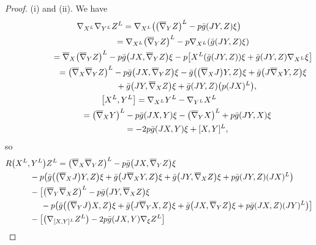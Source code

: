 \documentclass[10pt,a4paper]{amsart}
\numberwithin{equation}{section}
\theoremstyle{definition}
\newcommand{\bbn}{\overline{\nabla}}
\newcommand{\bgg}{\bar g}
\begin{document}
\begin{proof} (i) and (ii).
We have
\begin{gather*}\nabla_{X^{L}} \nabla_{Y^{L}} Z^{L}
 = \nabla_{X^{L}} \bigl( \bigl(\bbn_{Y} Z\bigr)^{L} - p \bgg (J Y, Z) \xi\bigr)\nonumber\\
 \hphantom{\nabla_{X^{L}} \nabla_{Y^{L}} Z^{L}}{}
 = \nabla_{X^{L}} \bigl(\bbn_{Y} Z\bigr)^{L} - p \nabla_{X^{L}} (\bgg (J Y, Z) \xi)\nonumber\\
 \hphantom{\nabla_{X^{L}} \nabla_{Y^{L}} Z^{L}}{}
 = \bbn_{X}\bigl(\bbn_{Y} Z\bigr)^{L} - p \bgg \bigl(J X, \bbn_{Y} Z \bigr) \xi - p \bigl[ X^{L} (\bgg(J Y, Z)) \xi + \bgg(J Y, Z) \nabla_{X^ L} \xi \bigr]\nonumber\\
 \hphantom{\nabla_{X^{L}} \nabla_{Y^{L}} Z^{L}}{}
 =\bigl(\bbn_{X} \bbn_{Y} Z\bigr)^{L} - p \bgg\bigl(J X, \bbn_{Y} Z\bigr) \xi
 - \bgg\bigl(\bigl(\bbn_{X} J\bigr) Y, Z\bigr) \xi + \bgg\bigl(J \bbn_{X} Y, Z\bigr) \xi \nonumber\\
 \hphantom{\nabla_{X^{L}} \nabla_{Y^{L}} Z^{L}=}{}
 + \bgg \bigl(J Y, \bbn_{X} Z\bigr) \xi + \bgg (JY, Z) \bigl(p (J X)^{L}\bigr),\nonumber\\
\bigl[X^{L}, Y^{L}\bigr]
 = \nabla_{X^ L} Y^{L} - \nabla_{Y^ L} X^{L} \nonumber\\
 \hphantom{\bigl[X^{L}, Y^{L}\bigr]}{}
 = \bigl(\bbn_{X} Y\bigr)^{L} - p \bgg(J X, Y) \xi - \bigl(\bbn_{Y} X\bigr)^{L} + p \bgg(J Y, X) \xi \nonumber\\
 \hphantom{\bigl[X^{L}, Y^{L}\bigr]}{}
 = -2 p \bgg(J X, Y) \xi + [X, Y]^{L}, \nonumber
\end{gather*}
so
\begin{align*}&R\bigl(X^{L}, Y^{L}\bigr) Z^{L}
 = \bigl(\bbn_{X} \bbn_{Y} Z\bigr)^{L} - p \bgg\bigl(J X, \bbn_{Y} Z\bigr) \xi \nonumber\\
 &\qquad\quad{} - p \bigl(\bgg\bigl(\bigl(\bbn_{X} J\bigr) Y, Z\bigr) \xi + \bgg\bigl(J \bbn_{X} Y, Z\bigr) \xi + \bgg\bigl(J Y, \bbn_{X} Z\bigr) \xi + p \bgg(J Y, Z) (J X)^{L}\bigr) \nonumber\\
 &\qquad\quad{} - \bigl[\bigl(\bbn_{Y} \bbn_{X} Z\bigr)^{L} - p \bgg\bigl(JY, \bbn_{X} Z\bigr) \xi \nonumber\\
 &\qquad\quad\hphantom{- \bigl[\, }{} - p \bigl(\bgg\bigl(\bigl(\bbn_{Y} J\bigr) X, Z\bigr) \xi + \bgg\bigl(J \bbn_{Y} X, Z\bigr) \xi + \bgg\bigl(J X, \bbn_{Y} Z\bigr) \xi + p \bgg(J X, Z) (J Y)^{L}\bigr)\bigr] \nonumber\\
 &\qquad\quad{} - \bigl[\bigl(\nabla_{[X,Y]^{L}} Z^{L}\bigr) - 2 p \bgg (J X, Y) \nabla_{\xi} Z^{L}\bigr] \nonumber\\

\end{align*}
\end{proof}
\end{document}
